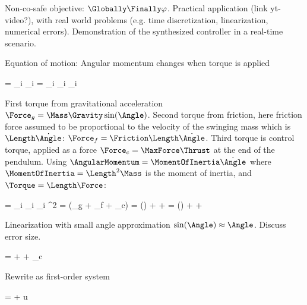 Non-co-safe objective: $\Globally \Finally \varphi$.
Practical application (link yt-video?), with real world problems (e.g. time discretization, linearization, numerical errors).
Demonstration of the synthesized controller in a real-time scenario.


\startsubsection[title={Derivation}]

    Equation of motion: Angular momentum changes when torque is applied

    \startformula
        \dot\AngularMomentum = \sum_{i} \Torque_i = \sum_{i} \Length_i \Force_i
    \stopformula

    First torque from gravitational acceleration $ \Force_g = \Mass \Gravity \sin(\Angle) $.
    Second torque from friction, here friction force assumed to be proportional to the velocity of the swinging mass which is $\Length \dot\Angle$: $\Force_f = \Friction \Length \dot\Angle$.
    Third torque is control torque, applied as a force $\Force_c = \MaxForce \Thrust$ at the end of the pendulum.
    Using $\AngularMomentum = \MomentOfInertia \dot\Angle$ where $\MomentOfInertia = \Length^2 \Mass$ is the moment of inertia, and $\Torque = \Length \Force$:

    \startformula
        \startalign[n=3,align={middle,right,left}]
            \NC
            \NC \dot\AngularMomentum =
            \NC \sum_{i} \Length_i \Force_i
            \NR
            \NC \Leftrightarrow \quad
            \NC \Length^2 \Mass \ddot\Angle =
            \NC \Length (\Force_g + \Force_f + \Force_c)
            \NR
            \NC \Leftrightarrow \quad
            \NC \Length \Mass \ddot\Angle =
            \NC \Mass \Gravity \sin(\Angle) + \Friction \Length \dot\Angle + \MaxForce \Thrust
            \NR
            \NC \Leftrightarrow \quad
            \NC \ddot\Angle =
            \NC \frac{\Gravity}{\Length} \sin(\Angle) + \frac{\Friction}{\Mass} \dot\Angle + \frac{\MaxForce}{\Length \Mass} \Thrust
            \NR
        \stopalign
    \stopformula

    Linearization with small angle approximation $\sin(\Angle) \approx \Angle$.
    Discuss error size.

    \startformula
        \ddot\Angle = \frac{\Gravity}{\Length} \Angle + \frac{\Friction}{\Mass} \dot\Angle +  \Force_c
    \stopformula

    Rewrite as first-order system

    \startformula
        \DDt \TwoByOne{\Angle}{\dot\Angle}
        =  \TwoByOne{\Angle}{\dot\Angle}
        +  u
    \stopformula

